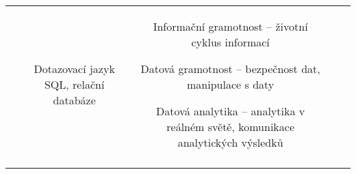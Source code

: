 \begin{landscape}
\begin{table}[htbp]
{\begin{tabularx}{\linewidth}{CCCCC}
&

Dotazovací jazyk SQL, relační databáze

&

Informační gramotnost – životní cyklus informací

Datová gramotnost – bezpečnost dat, manipulace s daty

Datová analytika – analytika v reálném světě, komunikace analytických výsledků 

\\

\tabularnewline
\bottomrule
\end{tabularx}

}

\end{table}

\end{landscape}